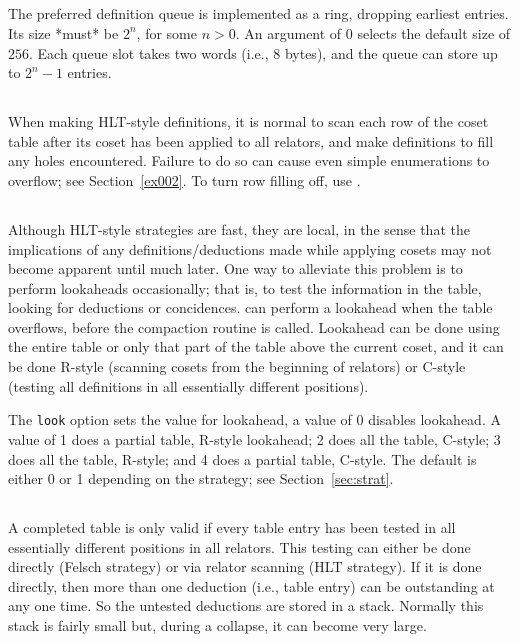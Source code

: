 \subsection{}
\label{cmd:pd size}
\label{cmd:psize}
The preferred definition queue is implemented as a ring, dropping
  earliest entries.
Its size *must* be $2^n$, for some $n>0$.
An argument of 0 selects the default size of $256$.
Each queue slot takes two words (i.e., 8 bytes), and the queue can store
  up to $2^n-1$ entries.

\subsection{}
\label{cmd:row filling}
When making HLT-style definitions, it is normal to scan each row of the
  coset table after its coset has been applied to all relators, and make 
  definitions to fill any holes encountered.
Failure to do so can cause even simple enumerations to overflow; see
  Section~\ref{ex002}.
To turn row filling off, use .
  
\subsection{}
\label{cmd:lookahead}
Although HLT-style strategies are fast, they are local, in the
sense that the implications of any definitions/deductions made while
applying cosets may not become apparent until much later.  One way to
alleviate this problem is to perform lookaheads occasionally; that is, to
test the information in the table, looking for deductions or concidences.
{\ace} can perform a lookahead when the table overflows, before the compaction
routine is called.  Lookahead can be done using the entire table or only
that part of the table above the current coset, and it can be done R-style
(scanning cosets from the beginning of relators) or C-style (testing all
definitions in all essentially different positions).

The {\tt look} option sets the value for lookahead, a value of 0 disables
lookahead.
A value of 1 does a
partial table, R-style lookahead; 2 does all the table, C-style; 3 does all
the table, R-style; and 4 does a partial table, C-style.  The default is
either 0 or 1 depending on the strategy;
see Section~\ref{sec:strat}.

\subsection{}
\label{cmd:ded mode}
\label{cmd:dmode}
A completed table is only valid if every table entry has been tested in all
essentially different positions in all relators.  This testing can either be
done directly (Felsch strategy) or via relator scanning (HLT strategy).  If
it is done directly, then more than one deduction (i.e., table entry) can be
outstanding at any one time.  So the untested deductions are stored in a
stack.  Normally this stack is fairly small but, during a collapse, it can
become very large.


